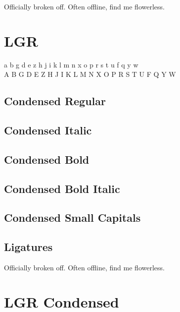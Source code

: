 \documentclass{article}
\begin{document}
Officially broken off. Often offline, find me flowerless.


\section*{LGR}


{\robotolgr\noindent
 a b g d e z h j i k l m n x o p r s t u f q y w\\
 A B G D E Z H J I K L M N X O P R S T U F Q Y W\\
}


\subsection*{Condensed Regular}

{\robotocondensed\lipsum[1]}

\subsection*{Condensed Italic}

{\robotocondensed\textit{\lipsum[2]}}

\subsection*{Condensed Bold}

{\robotoboldcondensed\lipsum[3]}



\subsection*{Condensed Bold Italic}

{\robotoboldcondensed\textit{\lipsum[4]}}


\subsection*{Condensed Small Capitals}

{\robotocondensed\textsc{\lipsum[1]}}

\subsection*{Ligatures}

{\robotocondensed Officially broken off. Often offline, find me flowerless.}


\section*{LGR Condensed}
\end{document}
